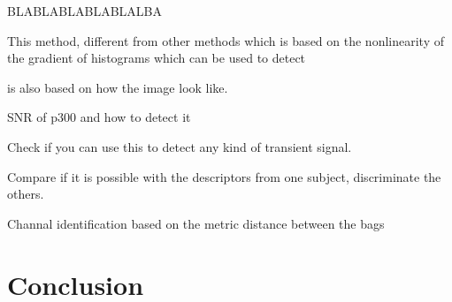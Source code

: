\documentclass[sensors,article,submit,moreauthors,pdftex,10pt,a4paper]{mdpi}
\begin{document}
BLABLABLABLABLALBA


This method, different from other methods which is based on the nonlinearity of the gradient of histograms which can be used to detect 

is also based on how the image look like.

SNR of p300 and how to detect it

Check if you can use this to detect any kind of transient signal.

Compare if it is possible with the descriptors from one subject, discriminate the others.

Channal identification based on the metric distance between the bags


\section{Conclusion}



%
%
%
%



\vspace{6pt} 

\end{document}
